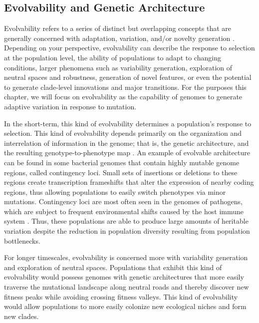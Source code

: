 \documentclass[PhD]{msu-thesis}
\begin{document}
\subsection{Evolvability and Genetic Architecture}
Evolvability refers to a series of distinct but overlapping concepts that are generally concerned with adaptation, variation, and/or novelty generation \cite{pigliucci_is_2008}. Depending on your perspective, evolvability can describe the response to selection at the population level\cite{fisher_genetical_1930,houle_comparing_1992}, the ability of populations to adapt to changing conditions\cite{belle_code_2002}, larger phenomena such as variability generation\cite{gunter_p._wagner_perspective:_1996}, 
exploration of neutral spaces and robustness\cite{andreas_wagner_robustness_2005,kitano_biological_2004}, 
generation of novel features\cite{alberch_genes_1991,brookfield_evolution:_2001}, 
or even the potential to generate clade-level innovations\cite{kirschner_evolvability_1998} 
and major transitions\cite{smith_major_1995}. For the purposes this chapter, we will focus on evolvability as the capability of genomes to generate adaptive variation in response to mutation. 

In the short-term, this kind of evolvability determines a population's response to selection. This kind of evolvability depends primarily on the organization and interrelation of information in the genome; that is, the genetic architecture, and the resulting genotype-to-phenotype map \cite{gunter_p._wagner_perspective:_1996}. An example of evolvable architecture can be found in some bacterial genomes that contain highly mutable genome regions, called contingency loci. Small sets of insertions or deletions to these regions create transcription frameshifts that alter the expression of nearby coding regions, thus allowing populations to easily switch phenotypes via minor mutations. Contingency loci are most often seen in the genomes of pathogens, which are subject to frequent environmental shifts caused by the host immune system \cite{bayliss_simple_2001}. Thus, these populations are able to produce large amounts of heritable variation despite the reduction in population diversity resulting from population bottlenecks.

For longer timescales, evolvability is concerned more with variability generation and exploration of neutral spaces. Populations that exhibit this kind of evolvability would possess genomes with genetic architectures that more easily traverse the mutational landscape along neutral roads and thereby discover new fitness peaks while avoiding crossing fitness valleys. This kind of evolvability would allow populations to more easily colonize new ecological niches and form new clades\cite{kirschner_evolvability_1998,brookfield_evolution:_2001}.
\end{document}
